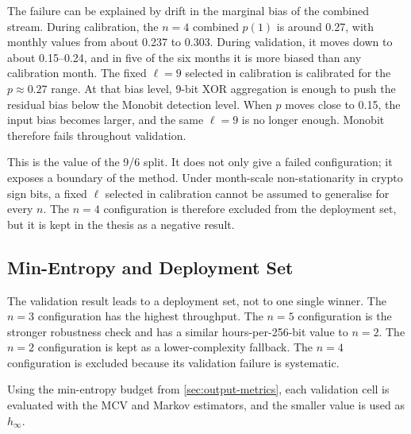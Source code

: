 \documentclass[11pt,titlepage,openany,oneside]{book}  %
\begin{document}
The failure can be explained by drift in the marginal bias of the combined stream. During calibration, the $n=4$ combined $p(1)$ is around 0.27, with monthly values from about 0.237 to 0.303. During validation, it moves down to about 0.15--0.24, and in five of the six months it is more biased than any calibration month. The fixed $\ell=9$ selected in calibration is calibrated for the $p \approx 0.27$ range. At that bias level, 9-bit XOR aggregation is enough to push the residual bias below the Monobit detection level. When $p$ moves close to 0.15, the input bias becomes larger, and the same $\ell=9$ is no longer enough. Monobit therefore fails throughout validation.

This is the value of the 9/6 split. It does not only give a failed configuration; it exposes a boundary of the method. Under month-scale non-stationarity in crypto sign bits, a fixed $\ell$ selected in calibration cannot be assumed to generalise for every $n$. The $n=4$ configuration is therefore excluded from the deployment set, but it is kept in the thesis as a negative result.

\subsection{Min-Entropy and Deployment Set}
\label{sec:exp4-min-entropy}

The validation result leads to a deployment set, not to one single winner. The $n=3$ configuration has the highest throughput. The $n=5$ configuration is the stronger robustness check and has a similar hours-per-256-bit value to $n=2$. The $n=2$ configuration is kept as a lower-complexity fallback. The $n=4$ configuration is excluded because its validation failure is systematic.

Using the min-entropy budget from \cref{sec:output-metrics}, each validation cell is evaluated with the MCV and Markov estimators, and the smaller value is used as $h_\infty$.
\end{document}
